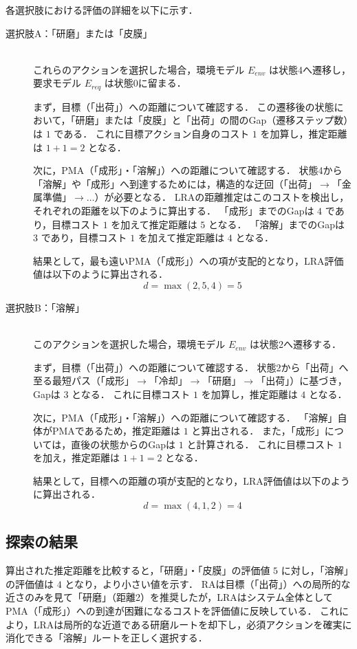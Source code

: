 \documentclass[a4paper,11pt,oneside,openany,report,dvipdfmx]{jsbook}
\newcommand{\descitem}[1]{\item[#1]\mbox{}\\}
\begin{document}
各選択肢における評価の詳細を以下に示す．

\begin{description}
  \descitem{選択肢A：「研磨」または「皮膜」}
  これらのアクションを選択した場合，環境モデル $E_\mathit{env}$ は状態4へ遷移し，要求モデル $E_\mathit{req}$ は状態0に留まる．

  まず，目標（「出荷」）への距離について確認する．
  この遷移後の状態において，「研磨」または「皮膜」と「出荷」の間のGap（遷移ステップ数）は $1$ である．
  これに目標アクション自身のコスト $1$ を加算し，推定距離は $1+1=2$ となる．

  次に，PMA（「成形」・「溶解」）への距離について確認する．
  状態4から「溶解」や「成形」へ到達するためには，構造的な迂回（「出荷」$\to$「金属準備」$\to \dots$）が必要となる．
  LRAの距離推定はこのコストを検出し，それぞれの距離を以下のように算出する．
  「成形」までのGapは $4$ であり，目標コスト $1$ を加えて推定距離は $5$ となる．
  「溶解」までのGapは $3$ であり，目標コスト $1$ を加えて推定距離は $4$ となる．

  結果として，最も遠いPMA（「成形」）への項が支配的となり，LRA評価値は以下のように算出される．
  $$ d = \max(2, 5, 4) = 5 $$

  \descitem{選択肢B：「溶解」}
  このアクションを選択した場合，環境モデル $E_\mathit{env}$ は状態2へ遷移する．

  まず，目標（「出荷」）への距離について確認する．
  状態2から「出荷」へ至る最短パス（「成形」$\to$「冷却」$\to$「研磨」$\to$「出荷」）に基づき，Gapは $3$ となる．
  これに目標コスト $1$ を加算し，推定距離は $4$ となる．

  次に，PMA（「成形」・「溶解」）への距離について確認する．
  「溶解」自体がPMAであるため，推定距離は $1$ と算出される．
  また，「成形」については，直後の状態からのGapは $1$ と計算される．
  これに目標コスト $1$ を加え，推定距離は $1+1=2$ となる．

  結果として，目標への距離の項が支配的となり，LRA評価値は以下のように算出される．
  $$ d = \max(4, 1, 2) = 4 $$
\end{description}

\subsection{探索の結果}

算出された推定距離を比較すると，「研磨」・「皮膜」の評価値 $5$ に対し，「溶解」の評価値は $4$ となり，より小さい値を示す．
RAは目標（「出荷」）への局所的な近さのみを見て「研磨」（距離2）を推奨したが，LRAはシステム全体としてPMA（「成形」）への到達が困難になるコストを評価値に反映している．
これにより，LRAは局所的な近道である研磨ルートを却下し，必須アクションを確実に消化できる「溶解」ルートを正しく選択する．
\end{document}
